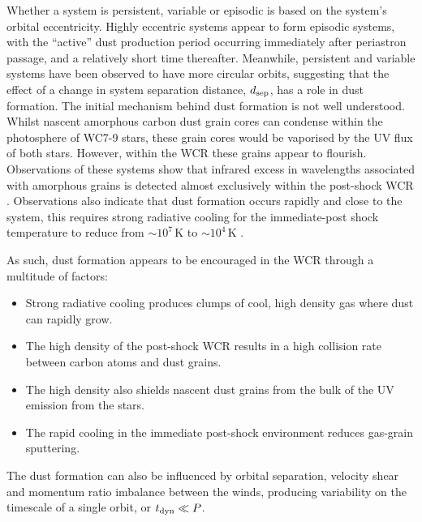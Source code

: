 Whether a system is persistent, variable or episodic is based on the system's orbital eccentricity.
Highly eccentric systems appear to form episodic systems, with the ``active'' dust production period occurring immediately after periastron passage, and a relatively short time thereafter.
Meanwhile, persistent and variable systems have been observed to have more circular orbits, suggesting that the effect of a change in system separation distance, $d_\text{sep}$, has a role in dust formation.
The initial mechanism behind dust formation is not well understood.
Whilst nascent amorphous carbon dust grain cores can condense within the photosphere of WC7-9 stars,
these grain cores would be vaporised by the UV flux of both stars.
However, within the WCR these grains appear to flourish.
Observations of these systems show that infrared excess in wavelengths associated with amorphous grains is detected almost exclusively within the post-shock WCR \parencite{soulainSPHEREViewWolfRayet2018}.
Observations also indicate that dust formation occurs rapidly and close to the system, this requires strong radiative cooling for the immediate-post shock temperature to reduce from $\sim 10^7 \, \si{\kelvin}$ to $\sim 10^4 \, \si{\kelvin}$
\parencite{williamsInfraredPhotometryLatetype1987,williamsMultifrequencyVariationsWolfrayet1990}.

As such, dust formation appears to be encouraged in the WCR through a multitude of factors:

\begin{itemize}
  \item Strong radiative cooling produces clumps of cool, high density gas where dust can rapidly grow.
  \item The high density of the post-shock WCR results in a high collision rate between carbon atoms and dust grains.
  \item The high density also shields nascent dust grains from the bulk of the UV emission from the stars.
  \item The rapid cooling in the immediate post-shock environment reduces gas-grain sputtering.
\end{itemize}

\noindent
The dust formation can also be influenced by orbital separation, velocity shear and momentum ratio imbalance between the winds, producing variability on the timescale of a single orbit, or $t_\text{dyn} \ll P$.

